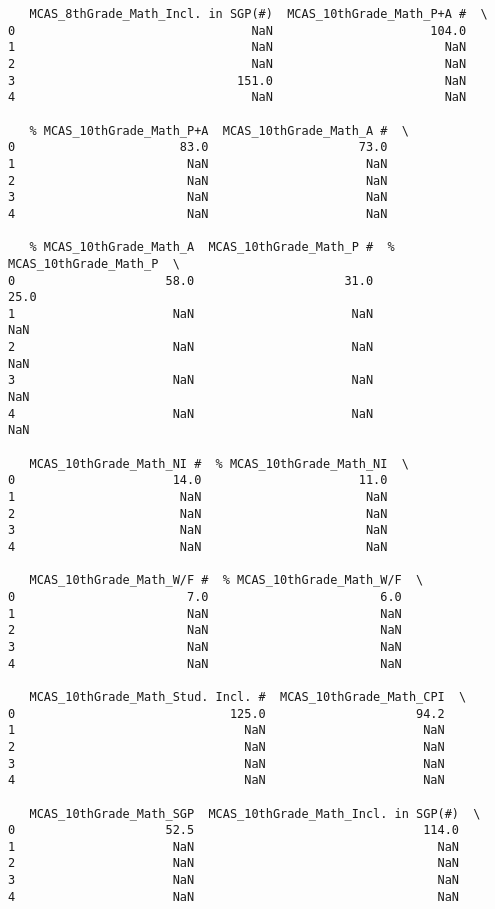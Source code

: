 \documentclass[11pt]{article}
\begin{document}
\begin{verbatim}
   MCAS_8thGrade_Math_Incl. in SGP(#)  MCAS_10thGrade_Math_P+A #  \
0                                 NaN                      104.0   
1                                 NaN                        NaN   
2                                 NaN                        NaN   
3                               151.0                        NaN   
4                                 NaN                        NaN   

   % MCAS_10thGrade_Math_P+A  MCAS_10thGrade_Math_A #  \
0                       83.0                     73.0   
1                        NaN                      NaN   
2                        NaN                      NaN   
3                        NaN                      NaN   
4                        NaN                      NaN   

   % MCAS_10thGrade_Math_A  MCAS_10thGrade_Math_P #  % MCAS_10thGrade_Math_P  \
0                     58.0                     31.0                     25.0   
1                      NaN                      NaN                      NaN   
2                      NaN                      NaN                      NaN   
3                      NaN                      NaN                      NaN   
4                      NaN                      NaN                      NaN   

   MCAS_10thGrade_Math_NI #  % MCAS_10thGrade_Math_NI  \
0                      14.0                      11.0   
1                       NaN                       NaN   
2                       NaN                       NaN   
3                       NaN                       NaN   
4                       NaN                       NaN   

   MCAS_10thGrade_Math_W/F #  % MCAS_10thGrade_Math_W/F  \
0                        7.0                        6.0   
1                        NaN                        NaN   
2                        NaN                        NaN   
3                        NaN                        NaN   
4                        NaN                        NaN   

   MCAS_10thGrade_Math_Stud. Incl. #  MCAS_10thGrade_Math_CPI  \
0                              125.0                     94.2   
1                                NaN                      NaN   
2                                NaN                      NaN   
3                                NaN                      NaN   
4                                NaN                      NaN   

   MCAS_10thGrade_Math_SGP  MCAS_10thGrade_Math_Incl. in SGP(#)  \
0                     52.5                                114.0   
1                      NaN                                  NaN   
2                      NaN                                  NaN   
3                      NaN                                  NaN   
4                      NaN                                  NaN   


\end{verbatim}
\end{document}
